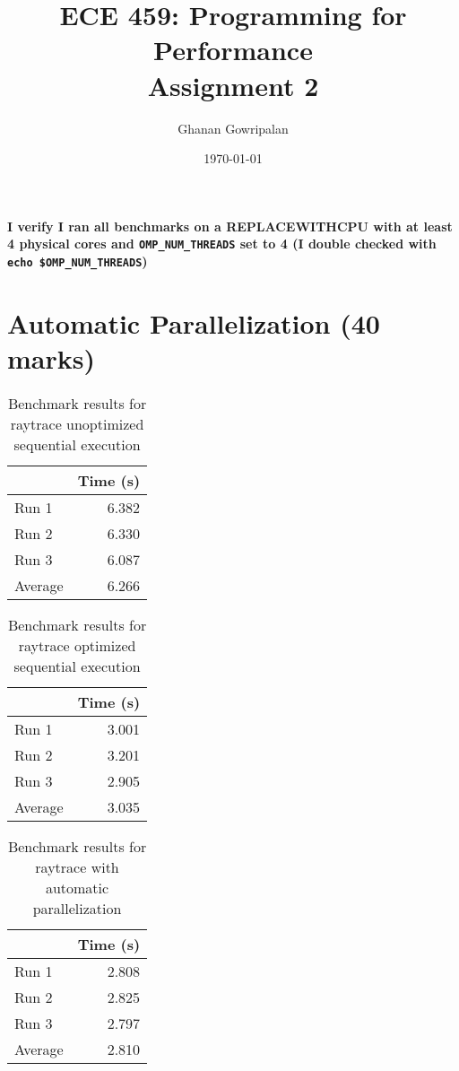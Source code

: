 \documentclass[12pt]{article}
\title{ECE 459: Programming for Performance\\Assignment 2}
\author{Ghanan Gowripalan}
\date{\today}
\begin{document}
\maketitle

{\bf I verify I ran all benchmarks on a REPLACEWITHCPU with at least 4 physical cores and
{\tt OMP\_NUM\_THREADS} set to 4 (I double checked with
{\tt echo \$OMP\_NUM\_THREADS})}

\section*{Automatic Parallelization (40 marks)}

\begin{table}[H]
  \centering
  \begin{tabular}{lr}
    & {\bf Time (s)} \\
    \hline
    Run 1 & 6.382 \\
    Run 2 & 6.330 \\
    Run 3 & 6.087 \\
    \hline
    Average & 6.266 \\
  \end{tabular}
  \caption{Benchmark results for raytrace unoptimized sequential execution}
  \label{tbl-raytrace-unopt-sequential}
\end{table}

\begin{table}[H]
  \centering
  \begin{tabular}{lr}
    & {\bf Time (s)} \\
    \hline
    Run 1 & 3.001 \\
    Run 2 & 3.201 \\
    Run 3 & 2.905 \\
    \hline
    Average & 3.035 \\
  \end{tabular}
  \caption{Benchmark results for raytrace optimized sequential execution}
  \label{tbl-raytrace-opt-sequential}
\end{table}

\begin{table}[H]
  \centering
  \begin{tabular}{lr}
    & {\bf Time (s)} \\
    \hline
    Run 1 & 2.808 \\
    Run 2 & 2.825 \\
    Run 3 & 2.797 \\
    \hline
    Average & 2.810 \\
  \end{tabular}
  \caption{Benchmark results for raytrace with automatic parallelization}
  \label{tbl-raytrace-automatic}
\end{table}
\end{document}
